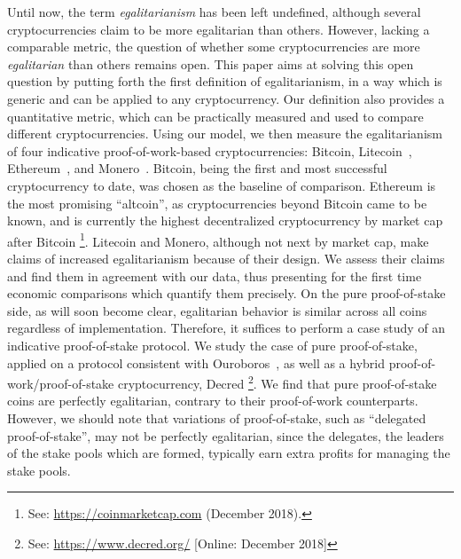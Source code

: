 Until now, the term \emph{egalitarianism} has been left undefined, although
several cryptocurrencies claim to be more egalitarian than others. However,
lacking a comparable metric, the question of whether some cryptocurrencies are
more \emph{egalitarian} than others remains open. This paper aims at solving this open question by
putting forth the first definition of egalitarianism, in a way which is
generic and can be applied to any cryptocurrency.
Our definition also provides a quantitative metric, which can be practically measured and used
to compare different cryptocurrencies.
Using our model, we then measure the egalitarianism of
four indicative proof-of-work-based
cryptocurrencies: Bitcoin, Litecoin~\cite{lee2011litecoin}, Ethereum~\cite{wood2014ethereum}, and Monero~\cite{van2013cryptonote}. Bitcoin, being the first and most successful cryptocurrency to date, was chosen as
the baseline of comparison. Ethereum is the most promising ``altcoin'', as cryptocurrencies beyond
Bitcoin came to be known, and is currently the highest decentralized cryptocurrency by market cap after Bitcoin \footnote{See: \url{https://coinmarketcap.com} (December 2018).}.
Litecoin and Monero, although not next by market cap,
make claims  of increased egalitarianism because of their design.
We assess their claims and find them in agreement with our data, thus presenting for the first time economic comparisons which quantify them precisely.
On the pure proof-of-stake side, as will soon become clear, egalitarian
behavior is similar across all coins regardless of implementation. Therefore,
it suffices to perform a case study of an indicative proof-of-stake protocol.
We study the case of pure proof-of-stake, applied on a protocol consistent with Ouroboros~\cite{C:KRDO17},
as well as a hybrid proof-of-work/proof-of-stake cryptocurrency,
Decred \footnote{See: \url{https://www.decred.org/} [Online: December 2018]}. We find that pure proof-of-stake coins are perfectly
egalitarian, contrary to their proof-of-work counterparts. However, we should
note that variations of proof-of-stake, such as ``delegated proof-of-stake'',
may not be perfectly egalitarian, since the delegates, \ie the leaders of
the stake pools which are formed, typically earn extra profits for managing the
stake pools.

